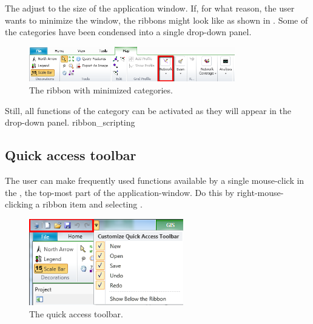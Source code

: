 %
\Note The  adjust to the size of the application window. If, for what reason, the user wants to minimize the window, the ribbons might look like as shown in . Some of the  categories have been condensed into a single drop-down panel.
\begin{figure}[H]
	\centering
	\includegraphics[width=0.8\textwidth]{figures/chapter_overview/ribbon_map_minimised.png}
	\caption{The ribbon with minimized categories.}
	\label{fig:ribbonmapminimised}		
\end{figure}
%
Still, all functions of the category can be activated as they will appear in the drop-down panel.
%
{ribbon_scripting}
%
\subsection{Quick access toolbar}
\label{ssec:Qaccestoolbar}
\Note The user can make frequently used functions available by a single mouse-click in the , the top-most part of the application-window. Do this by right-mouse-clicking a ribbon item and selecting .
%
\begin{figure}[H]
	\centering
	\includegraphics[width=0.6\textwidth]{figures/chapter_overview/quick_access_toolbar.png}
	\caption{The quick access toolbar.}
	\label{fig:qat}		
\end{figure}